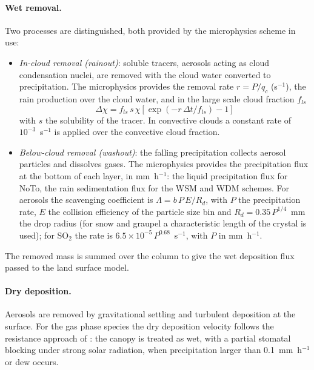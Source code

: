 {\paragraph{Wet removal.}
Two processes are distinguished, both provided by the microphysics scheme
in use:
\begin{itemize}
  \item \emph{In-cloud removal (rainout)}: soluble tracers, aerosols acting
    as cloud condensation nuclei, are removed with the cloud water converted
    to precipitation. The microphysics provides the removal rate
    $r = P/q_c$ (s$^{-1}$), the rain production over the cloud water, and in
    the large scale cloud fraction $f_{ls}$
    \begin{equation}
      \Delta\chi = f_{ls}\,s\,\chi\left[\exp(-r\,\Delta t/f_{ls})-1\right]
    \end{equation}
    with $s$ the solubility of the tracer. In convective clouds a constant
    rate of $10^{-3}$~s$^{-1}$ is applied over the convective cloud fraction.
  \item \emph{Below-cloud removal (washout)}: the falling precipitation
    collects aerosol particles and dissolves gases. The microphysics provides
    the precipitation flux at the bottom of each layer, in mm~h$^{-1}$: the
    liquid precipitation flux for NoTo, the rain sedimentation flux for the
    WSM and WDM schemes. For aerosols the
    scavenging coefficient is $\Lambda = b\,P\,E/R_d$, with $P$ the
    precipitation rate, $E$ the collision efficiency of the particle size bin
    and $R_d = 0.35\,P^{1/4}$~mm the drop radius (for snow and graupel a
    characteristic length of the crystal is used); for SO$_2$ the rate is
    $6.5\times10^{-5}\,P^{0.68}$~s$^{-1}$, with $P$ in mm~h$^{-1}$.
\end{itemize}
The removed mass is summed over the column to give the wet deposition flux
passed to the land surface model.

\paragraph{Dry deposition.}
Aerosols are removed by gravitational settling and turbulent deposition at
the surface. For the gas phase species the dry deposition velocity follows
the resistance approach of \citet{Zhang_03}: the canopy is treated as wet,
with a partial stomatal blocking under strong solar radiation, when
precipitation larger than 0.1~mm~h$^{-1}$ or dew occurs.

}
